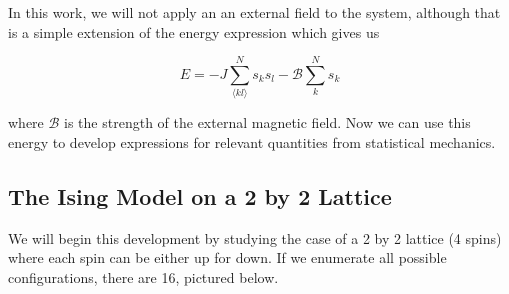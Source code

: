 \documentclass[%
oneside,                 %
final,                   %
10pt]{article}
\begin{document}
In this work, we will not apply an an external field to the system, although that is a simple extension of the energy expression which gives us

\begin{equation*}
E=-J \sum_{\langle k l \rangle}^N s_k s_l - \mathcal{B} \sum_k^N s_k
\end{equation*}

where $\mathcal{B}$ is the strength of the external magnetic field.  Now we can use this energy to develop expressions for relevant quantities from statistical mechanics.

\subsection{The Ising Model on a 2 by 2 Lattice}

We will begin this development by studying the case of a 2 by 2 lattice (4 spins) where each spin can be either up for down.  If we enumerate all possible configurations, there are 16, pictured below.
\end{document}
